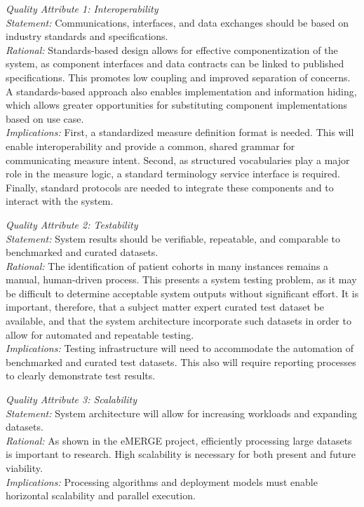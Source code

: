 \documentclass{amia}
\begin{document}
\textit{Quality Attribute 1: Interoperability}\\
\textit{Statement:} Communications, interfaces, and data exchanges should be based on industry standards and specifications.\\
\textit{Rational:} Standards-based design allows for effective componentization of the system, as component interfaces and data contracts can be linked to published specifications. This promotes low coupling and improved separation of concerns. A standards-based approach also enables implementation and information hiding\cite{sullivan2001structure}, which allows greater opportunities for substituting component implementations based on use case.\\
\textit{Implications:} First, a standardized measure definition format is needed. This will enable interoperability and provide a common, shared grammar for communicating measure intent. Second, as structured vocabularies play a major role in the measure logic, a standard terminology service interface is required. Finally, standard protocols are needed to integrate these components and to interact with the system.

\textit{Quality Attribute 2: Testability}\\
\textit{Statement:} System results should be verifiable, repeatable, and comparable to benchmarked and curated datasets.\\
\textit{Rational:} The identification of patient cohorts in many instances remains a manual, human-driven process\cite{tao2013phenotyping}. This presents a system testing problem, as it may be difficult to determine acceptable system outputs without significant effort. It is important, therefore, that a subject matter expert curated test dataset be available, and that the system architecture incorporate such datasets in order to allow for automated and repeatable testing.\\
\textit{Implications:} Testing infrastructure will need to accommodate the automation of benchmarked and curated test datasets. This also will require reporting processes to clearly demonstrate test results.

\textit{Quality Attribute 3: Scalability}\\
\textit{Statement:} System architecture will allow for increasing workloads and expanding datasets.\\
\textit{Rational:} As shown in the eMERGE\cite{gottesman2013electronic} project, efficiently processing large datasets is important to research. High scalability is necessary for both present and future viability.\\
\textit{Implications:} Processing algorithms and deployment models must enable horizontal scalability and parallel execution.
\end{document}
